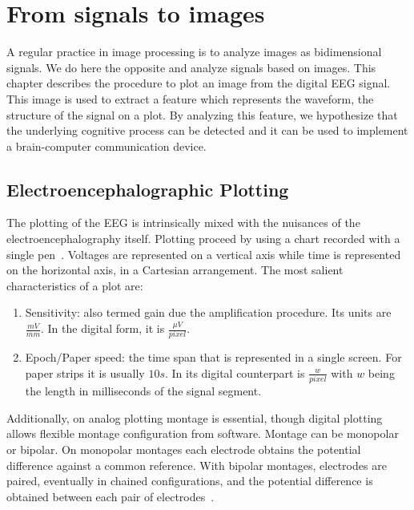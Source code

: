 \chapter{From signals to images}
\label{chapter:two}


A regular practice in image processing is to analyze images as bidimensional signals.  We do here the opposite and analyze signals based on images.
This chapter describes the procedure to plot an image from the digital EEG signal.  This image is used to extract a feature which represents the waveform, the structure of the signal on a plot.  By analyzing this feature, we hypothesize that the underlying cognitive process can be detected and it can be used to implement a brain-computer communication device.

\section{Electroencephalographic Plotting}

The plotting of the EEG is intrinsically mixed with the nuisances of the electroencephalography itself.  Plotting proceed by using a chart recorded with a single pen~\cite{Jestico1977}.   Voltages are represented on a vertical axis while time is represented on the horizontal axis, in a Cartesian arrangement.  The most salient characteristics of a plot are:

\begin{enumerate}
\item Sensitivity: also termed gain due the amplification procedure.  Its units are $ \frac{mV}{mm}$.  In the digital form, it is $\frac{\mu V}{pixel}$.
\item Epoch/Paper speed: the time span that is represented in a single screen.  For paper strips it is usually $10s$.  In its digital counterpart is $ \frac{w}{pixel}$ with $w$ being the length in milliseconds of the signal segment.
\end{enumerate}

Additionally, on analog plotting montage is essential, though digital plotting allows flexible montage configuration from software.  Montage can be monopolar or bipolar.  On monopolar montages each electrode obtains the potential difference against a common reference. With bipolar montages, electrodes are paired, eventually in chained configurations, and the potential difference is obtained between each pair of electrodes~\cite{EEGIntro}.

